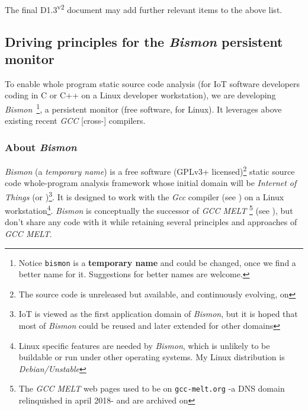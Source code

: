 The final D1.3\textsuperscript{v2} document may add further relevant
items to the above list.

\medskip

\subsection{Driving principles for the  \textit{Bismon} persistent monitor}
\label{subsec:principles-bismon}

To enable whole program static source code analysis (for IoT software
developers coding in C or C++ on a Linux developer workstation), we
are developing \emph{Bismon}~\footnote{Notice \texttt{bismon} is a
  \textbf{temporary name} and could be changed, once we find a better
  name for it. Suggestions for better names are welcome.}, a
persistent monitor (free software, for Linux). It leverages above
existing recent \emph{GCC} [cross-] compilers.


\subsubsection{About \emph{Bismon}}
\label{subsubsec:about-bismon}

\textit{Bismon} (a \emph{temporary
  name}) is a free software (GPLv3+ licensed)\footnote{The
  source code is unreleased but available, and continuously evolving,
  on } static source code
whole-program analysis framework whose initial domain will be
\emph{Internet of Things} (or )\footnote{IoT is viewed
  as the first application domain of \textit{Bismon}, but it is hoped
  that most of \textit{Bismon} could be reused and later extended for
  other domains}. It is designed to work with the \textit{Gcc}
compiler (see ) on a Linux
workstation\footnote{Linux specific features are needed by
  \textit{Bismon}, which is unlikely to be buildable or run under
  other operating systems. My Linux distribution is
  \emph{Debian/Unstable}}. \textit{Bismon} is conceptually the
successor of \textit{GCC MELT} \footnote{The \textit{GCC MELT} web
  pages used to be on \texttt{gcc-melt.org} -a DNS domain relinquished
  in april 2018- and are archived on
  } (see
\cite{Starynkevitch2007Multistage, Starynkevitch-DSL2011}), but don't
share any code with it while retaining several principles and
approaches of \emph{GCC MELT}.

